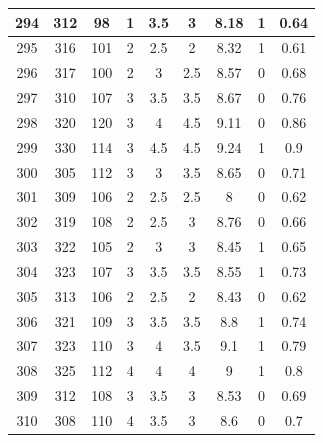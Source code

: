 \documentclass[11pt]{article}
\begin{document}
\begin{appendix}
\begin{longtable}[H]{|c|c|c|c|c|c|c|c|c|}
	294        & 312       & 98          & 1                 & 3.5 & 3   & 8.18 & 1        & 0.64            \\ \hline
	295        & 316       & 101         & 2                 & 2.5 & 2   & 8.32 & 1        & 0.61            \\ \hline
	296        & 317       & 100         & 2                 & 3   & 2.5 & 8.57 & 0        & 0.68            \\ \hline
	297        & 310       & 107         & 3                 & 3.5 & 3.5 & 8.67 & 0        & 0.76            \\ \hline
	298        & 320       & 120         & 3                 & 4   & 4.5 & 9.11 & 0        & 0.86            \\ \hline
	299        & 330       & 114         & 3                 & 4.5 & 4.5 & 9.24 & 1        & 0.9             \\ \hline
	300        & 305       & 112         & 3                 & 3   & 3.5 & 8.65 & 0        & 0.71            \\ \hline
	301        & 309       & 106         & 2                 & 2.5 & 2.5 & 8    & 0        & 0.62            \\ \hline
	302        & 319       & 108         & 2                 & 2.5 & 3   & 8.76 & 0        & 0.66            \\ \hline
	303        & 322       & 105         & 2                 & 3   & 3   & 8.45 & 1        & 0.65            \\ \hline
	304        & 323       & 107         & 3                 & 3.5 & 3.5 & 8.55 & 1        & 0.73            \\ \hline
	305        & 313       & 106         & 2                 & 2.5 & 2   & 8.43 & 0        & 0.62            \\ \hline
	306        & 321       & 109         & 3                 & 3.5 & 3.5 & 8.8  & 1        & 0.74            \\ \hline
	307        & 323       & 110         & 3                 & 4   & 3.5 & 9.1  & 1        & 0.79            \\ \hline
	308        & 325       & 112         & 4                 & 4   & 4   & 9    & 1        & 0.8             \\ \hline
	309        & 312       & 108         & 3                 & 3.5 & 3   & 8.53 & 0        & 0.69            \\ \hline
	310        & 308       & 110         & 4                 & 3.5 & 3   & 8.6  & 0        & 0.7             \\ \hline

\end{longtable}
\end{appendix}
\end{document}
